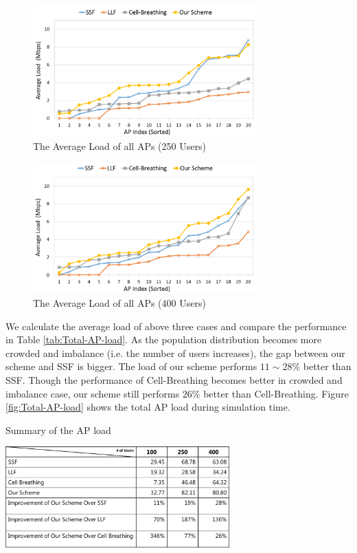 \begin{figure}[tbp]
\setlength{\abovecaptionskip}{0pt}
\setlength{\belowcaptionskip}{0pt}
\begin{center}
\includegraphics[width=3.4in]{images/Average_AP_load_250.png}
\end{center}
\caption{The Average Load of all APs (250 Users)}
\label{fig:fig4_2b}
\end{figure}

\begin{figure}[tbp]
\setlength{\abovecaptionskip}{0pt}
\setlength{\belowcaptionskip}{0pt}
\begin{center}
\includegraphics[width=3.4in]{images/Average_AP_load_400.png}
\end{center}
\caption{The Average Load of all APs (400 Users)}
\label{fig:fig4_2c}
\end{figure}

We calculate the average load of above three cases and compare the performance in Table \ref{tab:Total-AP-load}. As the population distribution becomes more crowded and imbalance (i.e. the number of users increases), the gap between our scheme and SSF is bigger. The load of our scheme performs $11\sim28\%$ better than SSF. Though the performance of Cell-Breathing becomes better in crowded and imbalance case, our scheme still performs $26\%$ better than Cell-Breathing. Figure \ref{fig:Total-AP-load} shows the total AP load during simulation time.

\begin{table}[tbp]
\setlength{\belowcaptionskip}{15pt}
\centering
\caption{Summary of the AP load}
\label{tab:Total-AP-load}
\includegraphics[width=3.4in]{images/table4_3.png}
\end{table}

